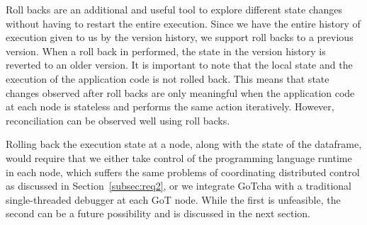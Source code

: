 Roll backs are an additional and useful tool to explore different state changes without having to restart the entire execution. Since we have the entire history of execution given to us by the version history, we support roll backs to a previous version. When a roll back in performed, the state in the version history is reverted to an older version. It is important to note that the local state and the execution of the application code is not rolled back. This means that state changes observed after roll backs are only meaningful when the application code at each node is stateless and performs the same action iteratively. However, reconciliation can be observed well using roll backs. 

Rolling back the execution state at a node, along with the state of the dataframe, would require that we either take control of the programming language runtime in each node, which suffers the same problems of coordinating distributed control as discussed in Section~\ref{subsec:req2}, or we integrate GoTcha with a traditional single-threaded debugger at each GoT node. While the first is unfeasible, the second can be a future possibility and is discussed in the next section.
